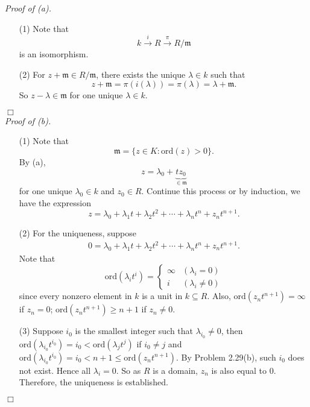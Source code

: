 \documentclass{article}
\begin{document}
\emph{Proof of (a).}
\begin{enumerate}
\item[(1)]
  Note that
  \[
    k \xrightarrow{i} R \xrightarrow{\pi} R/\mathfrak{m}
  \]
  is an isomorphism.

\item[(2)]
  For $z + \mathfrak{m} \in R/\mathfrak{m}$,
  there exists the unique $\lambda \in k$ such that
  \[
    z + \mathfrak{m}
    = \pi(i(\lambda))
    = \pi(\lambda)
    = \lambda + \mathfrak{m}.
  \]
  So $z - \lambda \in \mathfrak{m}$ for one unique $\lambda \in k$.
\end{enumerate}
$\Box$ \\



\emph{Proof of (b).}
\begin{enumerate}
\item[(1)]
  Note that
  \[
    \mathfrak{m} = \{ z \in K : \mathrm{ord}(z) > 0 \}.
  \]
  By (a),
  \[
    z = \lambda_0 + \underbrace{t z_0}_{\in \mathfrak{m}}
  \]
  for one unique $\lambda_0 \in k$ and $z_0 \in R$.
  Continue this process or by induction, we have the expression
  \[
    z = \lambda_0 + \lambda_1 t + \lambda_2 t^2 + \cdots + \lambda_n t^n + z_n t^{n+1}.
  \]

\item[(2)]
  For the uniqueness,
  suppose
  \begin{align*}
    0 = \lambda_0 + \lambda_1 t + \lambda_2 t^2 + \cdots + \lambda_n t^n + z_n t^{n+1}.
  \end{align*}
  Note that
  \begin{equation*}
    \mathrm{ord}(\lambda_i t^i) =
    \begin{cases}
      \infty
        &(\lambda_i = 0) \\
      i
        &(\lambda_i \neq 0)
    \end{cases}
  \end{equation*}
  since every nonzero element in $k$ is a unit in $k \subseteq R$.
  Also, $\mathrm{ord}(z_n t^{n+1}) = \infty$ if $z_n = 0$;
  $\mathrm{ord}(z_n t^{n+1}) \geq n+1$ if $z_n \neq 0$.

\item[(3)]
  Suppose $i_0$ is the smallest integer such that $\lambda_{i_0} \neq 0$,
  then $\mathrm{ord}(\lambda_{i_0} t^{i_0}) = i_0 < \mathrm{ord}(\lambda_{j} t^{j})$
  if $i_0 \neq j$ and $\mathrm{ord}(\lambda_{i_0} t^{i_0}) = i_0 < n+1 \leq \mathrm{ord}(z_n t^{n+1})$.
  By Problem 2.29(b), such $i_0$ does not exist.
  Hence all $\lambda_i = 0$.
  So as $R$ is a domain, $z_n$ is also equal to $0$.
  Therefore, the uniqueness is established.
\end{enumerate}
$\Box$ \\\\
\end{document}
